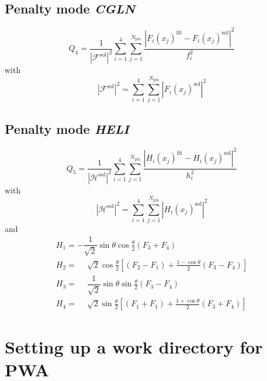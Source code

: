 \documentclass[a4paper,10pt]{article}
\def\PWA{\ttfamily PWA\rmfamily\ }
\begin{document}
\subsection{Penalty mode \textit{CGLN}}

\begin{displaymath}
 Q_4 =\frac{1}{|\mathcal{F}^\mathrm{sol}|^2}
\sum_{i=1}^4
\sum_{j=1}^{N_\mathrm{pts}}
\frac{|F_i(x_j)^\mathrm{fit} - F_i(x_j)^\mathrm{sol}|^2}{f_i^2}
\end{displaymath}
with
\begin{displaymath}
 |\mathcal{F}^\mathrm{sol}|^2 = \sum_{i=1}^4\sum_{j=1}^{N_\mathrm{pts}} |F_i(x_j)^\mathrm{sol}|^2
\end{displaymath}

\subsection{Penalty mode \textit{HELI}}

\begin{displaymath}
 Q_5 =\frac{1}{|\mathcal{H}^\mathrm{sol}|^2}
\sum_{i=1}^4
\sum_{j=1}^{N_\mathrm{pts}}
\frac{|H_i(x_j)^\mathrm{fit} - H_i(x_j)^\mathrm{sol}|^2}{h_i^2}
\end{displaymath}
with
\begin{displaymath}
 |\mathcal{H}^\mathrm{sol}|^2 = \sum_{i=1}^4\sum_{j=1}^{N_\mathrm{pts}} |H_i(x_j)^\mathrm{sol}|^2
\end{displaymath}
and
\begin{displaymath}\label{frm_Heli}
\begin{array}{l}
H_1 =           -\dfrac{1}{\sqrt{2}}\sin\theta\cos\frac{\theta}{2} \left(F_3 + F_4\right) \\
H_2 = \phantom{-}\sqrt{2}\cos\frac{\theta}{2}\left[\left(F_2 - F_1\right) + \frac{1-\cos\theta}{2}\left(F_3 - F_4\right)\right] \\
H_3 = \phantom{-}\dfrac{1}{\sqrt{2}}\sin\theta\sin\frac{\theta}{2} \left(F_3 - F_4\right) \\
H_4 = \phantom{-}\sqrt{2}\sin\frac{\theta}{2}\left[\left(F_1 + F_1\right) + \frac{1+\cos\theta}{2}\left(F_3 + F_4\right)\right]
\end{array}
\end{displaymath}

\section{Setting up a work directory for \PWA}
\end{document}

